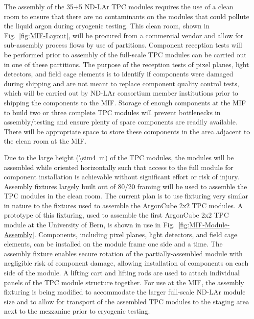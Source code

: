 The assembly of the 35+5 ND-LAr TPC modules requires the use of a clean room to ensure that there are no contaminants on the modules that could pollute the liquid argon during cryogenic testing.  This clean room, shown in Fig.~\ref{fig:MIF-Layout}, will be procured from a commercial vendor and allow for sub-assembly process flows by use of partitions.  Component reception tests will be performed prior to assembly of the full-scale TPC modules can be carried out in one of these partitions.  The purpose of the reception tests of pixel planes, light detectors, and field cage elements is to identify if components were damaged during shipping and are not meant to replace component quality control tests, which will be carried out by ND-LAr consortium member institutions prior to shipping the components to the MIF.  Storage of enough components at the MIF to build two or three complete TPC modules will prevent bottlenecks in assembly/testing and ensure plenty of spare components are readily available.  There will be appropriate space to store these components in the area adjacent to the clean room at the MIF.

Due to the large height (\SI{\sim4}{m}) of the TPC modules, the modules will be assembled while oriented horizontally such that access to the full module for component installation is achievable without significant effort or risk of injury.  Assembly fixtures largely built out of 80/20 framing will be used to assemble the TPC modules in the clean room.  The current plan is to use fixturing very similar in nature to the fixtures used to assemble the ArgonCube 2x2 TPC modules.  A prototype of this fixturing, used to assemble the first ArgonCube 2x2 TPC module at the University of Bern, is shown in use in Fig.~\ref{fig:MIF-Module-Assembly}.  Components, including pixel planes, light detectors, and field cage elements, can be installed on the module frame one side and a time.  The assembly fixture enables secure rotation of the partially-assembled module with negligible risk of component damage, allowing installation of components on each side of the module.  A lifting cart and lifting rods are used to attach individual panels of the TPC module structure together.  For use at the MIF, the assembly fixturing is being modified to accommodate the larger full-scale ND-LAr module size and to allow for transport of the assembled TPC modules to the staging area next to the mezzanine prior to cryogenic testing.

